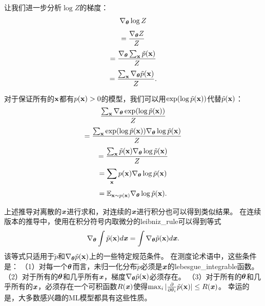 让我们进一步分析$\log Z$的梯度：
\begin{equation}
	\nabla_{\boldsymbol{\theta}} \log Z
\end{equation}
\begin{equation}
	= \frac{ \nabla_{\boldsymbol{\theta}} Z }{Z}
\end{equation}
\begin{equation}
	= \frac{ \nabla_{\boldsymbol{\theta}} \sum_{\mathbf{x}} \tilde{p}(\mathbf{x}) }{Z}
\end{equation}
\begin{equation}
	= \frac{ \sum_{\mathbf{x}} \nabla_{\boldsymbol{\theta}} \tilde{p}(\mathbf{x}) }{Z}.
\end{equation}


对于保证所有的$\mathbf{x}$都有$p(\mathbf{x}) > 0$的模型，我们可以用$\exp(\log \tilde{p}(\mathbf{x}))$代替$\tilde{p}(\mathbf{x})$：
\begin{equation}
	\frac{ \sum_{\mathbf{x}} \nabla_{\boldsymbol{\theta}} \exp (\log \tilde{p} (\mathbf{x})) }{ Z }
\end{equation}
\begin{equation}
	= \frac{  \sum_{\mathbf{x}}  \exp (\log \tilde{p} (\mathbf{x})) \nabla_{\boldsymbol{\theta}} \log \tilde{p}(\mathbf{x})  }{Z}
\end{equation}
\begin{equation}
	=\frac{  \sum_{\mathbf{x}} \tilde{p} (\mathbf{x})  \nabla_{\boldsymbol{\theta}} \log \tilde{p}(\mathbf{x})  }{ Z}
\end{equation}
\begin{equation}
	=\sum_{\mathbf{x}} p(\mathbf{x}) \nabla_{\boldsymbol{\theta}} \log \tilde{p} ( \mathbf{x} )
 \end{equation}
\begin{equation}
	=\mathbb{E}_{\mathbf{x} \sim p(\mathbf{x})} \nabla_{\boldsymbol{\theta}} \log \tilde{p} (\mathbf{x}).
\end{equation}


上述推导对离散的$\boldsymbol{\mathit{x}}$进行求和，对连续的$\boldsymbol{\mathit{x}}$进行积分也可以得到类似结果。
在连续版本的推导中，使用在积分符号内取微分的\gls{leibniz_rule}可以得到等式
\begin{equation}
	\nabla_{\boldsymbol{\theta}} \int \tilde{p} (\mathbf{x}) d \boldsymbol{\mathit{x}}  = \int \nabla_{\boldsymbol{\theta}} 
\tilde{p} (\mathbf{x}) d \boldsymbol{\mathit{x}}.
\end{equation}
该等式只适用于$\tilde{p}$和$\nabla_{\boldsymbol{\theta}} \tilde{p} (\mathbf{x})$上的一些特定规范条件。
在测度论术语中，这些条件是：
（1）对每一个$\boldsymbol{\theta}$而言，未归一化分布$\tilde{p}$必须是$\boldsymbol{\mathit{x}}$的\gls{lebesgue_integrable}函数。
（2）对于所有的$\boldsymbol{\theta}$和几乎所有$\boldsymbol{\mathit{x}}$，梯度$\nabla_{\boldsymbol{\theta}} \tilde{p}(\mathbf{x})$必须存在。
（3）对于所有的$\boldsymbol{\theta}$和几乎所有的$\boldsymbol{\mathit{x}}$，必须存在一个可积函数$R(\boldsymbol{\mathit{x}})$使得$\max_i | \frac{\partial}{\partial \theta_i } \tilde{p} (\mathbf{x}) | \leq R(\boldsymbol{\mathit{x}})$。
幸运的是，大多数感兴趣的\gls{ML}模型都具有这些性质。

